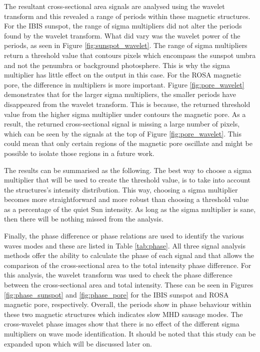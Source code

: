     The resultant cross-sectional area signals are analysed using the wavelet transform and this revealed a range of periods within these magnetic structures.
    For the IBIS sunspot, the range of sigma multipliers did not alter the periods found by the wavelet transform.
    What did vary was the wavelet power of the periods, as seen in Figure \ref{fig:sunspot_wavelet}. 
    The range of sigma multipliers return a threshold value that contours pixels which encompass the sunspot umbra and not the penumbra or background photosphere.
    This is why the sigma multiplier has little effect on the output in this case.
    For the ROSA magnetic pore, the difference in multipliers is more important.
    Figure \ref{fig:pore_wavelet} demonstrates that for the larger sigma multipliers, the smaller periods have disappeared from the wavelet transform. 
    This is because, the returned threshold value from the higher sigma multiplier under contours the magnetic pore.
    As a result, the returned cross-sectional signal is missing a large number of pixels, which can be seen by the signals at the top of Figure \ref{fig:pore_wavelet}.
    This could mean that only certain regions of the magnetic pore oscillate and might be possible to isolate those regions in a future work.
  
    The results can be summarised as the following.
    The best way to choose a sigma multiplier that will be used to create the threshold value, is to take into account the structures's intensity distribution.
    This way, choosing a sigma multiplier becomes more straightforward and more robust than choosing a threshold value as a percentage of the quiet Sun intensity.
    As long as the sigma multiplier is sane, then there will be nothing missed from the analysis.
    
    Finally, the phase difference or phase relations are used to identify the various waves modes and these are listed in Table \ref{tab:phase}.
    All three signal analysis methods offer the ability to calculate the phase of each signal and that allows the comparison of the cross-sectional area to the total intensity phase difference.
    For this analysis, the wavelet transform was used to check the phase difference between the cross-sectional area and total intensity.
    These can be seen in Figures \ref{fig:phase_sunspot} and \ref{fig:phase_pore} for the IBIS sunspot and ROSA magnetic pore, respectively.
    Overall, the periods show in phase behaviour within these two magnetic structures which indicates slow MHD sausage modes. 
    The cross-wavelet phase images show that there is no effect of the different sigma multipliers on wave mode identification.
    It should be noted that this study can be expanded upon which will be discussed later on. 
    
